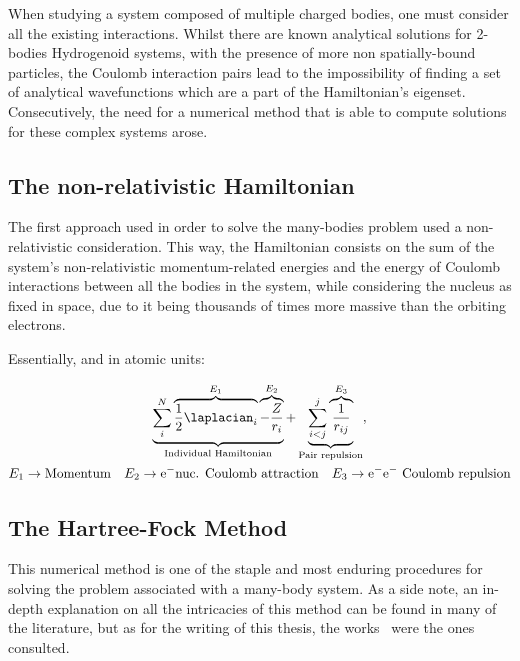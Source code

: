 When studying a system composed of multiple charged bodies, one must consider all the existing interactions. Whilst there are known analytical solutions for 2-bodies Hydrogenoid systems, with the presence of more non spatially-bound particles, the Coulomb interaction pairs lead to the impossibility of finding a set of analytical wavefunctions which are a part of the Hamiltonian's eigenset. Consecutively, the need for a numerical method that is able to compute solutions for these complex systems arose.

\subsection{The non-relativistic Hamiltonian}

The first approach used in order to solve the many-bodies problem used a non-relativistic consideration. This way, the Hamiltonian consists on the sum of the system's non-relativistic momentum-related energies and the energy of Coulomb interactions between all the bodies in the system, while considering the nucleus as fixed in space, due to it being thousands of times more massive than the orbiting electrons.

Essentially, and in atomic units:




\begin{equation}
    \begin{gathered}
        \underbrace{\sum_i^N \overbrace{ \dfrac{1}{2}\laplacian_i}^{E_1}  \overbrace{-\frac{Z}{r_i}}^{E_2}}_{\text{Individual Hamiltonian}}  + \underbrace{\sum_{i<j}^{j}\overbrace{\dfrac{1}{r_{ij}}}^{E_3}}_{\text{Pair repulsion}},\\
        E_1\rightarrow\text{Momentum}\quad E_2\rightarrow\text{e$^-$nuc. Coulomb attraction}\quad E_3\rightarrow\text{e$^-$e$^-$ Coulomb repulsion}
    \end{gathered}
    \label{eq:nonRelHam}
\end{equation}



\subsection{The Hartree-Fock Method}\label{sec:HF}

This numerical method is one of the staple and most enduring procedures for solving the problem associated with a many-body system. As a side note, an in-depth explanation on all the intricacies of this method can be found in many of the literature, but as for the writing of this thesis, the works~\cite{HFweb,JPS,Ramon,Blinder2018} were the ones consulted.

